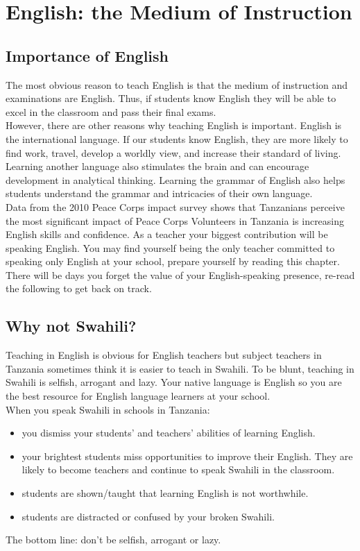 \chapter{English: the Medium of Instruction}
\section{Importance of English}

The most obvious reason to teach English is that the medium of instruction
and examinations are English. Thus, if students know English they
will be able to excel in the classroom and pass their final exams.\\


However, there are other reasons why teaching English is important.
English is the international language. If our students know English,
they are more likely to find work, travel, develop a worldly view,
and increase their standard of living. Learning another language also
stimulates the brain and can encourage development in analytical thinking.
Learning the grammar of English also helps students understand the
grammar and intricacies of their own language.\\


Data from the 2010 Peace Corps impact survey shows that Tanzanians
perceive the most significant impact of Peace Corps Volunteers in
Tanzania is increasing English skills and confidence. As a teacher
your biggest contribution will be speaking English. You may find yourself
being the only teacher committed to speaking only English at your
school, prepare yourself by reading this chapter. There will be days
you forget the value of your English-speaking presence, re-read the
following to get back on track.


\section{Why not Swahili?}

Teaching in English is obvious for English teachers but subject teachers
in Tanzania sometimes think it is easier to teach in Swahili. To be
blunt, teaching in Swahili is selfish, arrogant and lazy. Your native
language is English so you are the best resource for English language
learners at your school.\\


When you speak Swahili in schools in Tanzania:
\begin{itemize}
\item you dismiss your students' and teachers' abilities of learning English. 
\item your brightest students miss opportunities to improve their English.
They are likely to become teachers and continue to speak Swahili in
the classroom.
\item students are shown/taught that learning English is not worthwhile.
\item students are distracted or confused by your broken Swahili. 
\end{itemize}
The bottom line: don't be selfish, arrogant or lazy.

